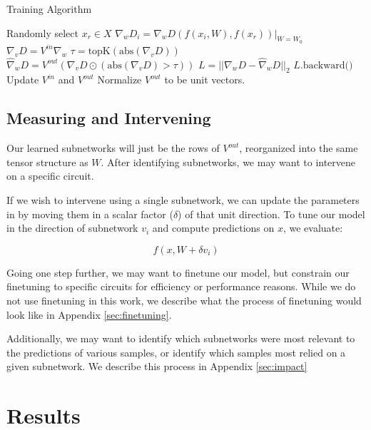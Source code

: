 \documentclass{article}
\theoremstyle{plain}
\theoremstyle{definition}
\theoremstyle{remark}
\begin{document}
\begin{algorithm}\label{alg:training}
\caption{Training Algorithm}
\begin{algorithmic}[1]
            \STATE Randomly select $x_r \in X$
            \STATE $\nabla_w D_i = \nabla_w D(f(x_i, W), f(x_r))|_{W=W_0}$
        \ENDFOR
        \STATE $\nabla_v D = {V^{in}} \nabla_w$
        \STATE $\tau = \text{topK}(\text{abs}(\nabla_v D))$
        \STATE $\hat{\nabla}_w D = {V^{out}} (\nabla_v D \odot (\text{abs}(\nabla_v D) > \tau))$
        \STATE $L = {|| \nabla_w D - \hat{\nabla}_w D ||}_2$
        \STATE $L.\text{backward()}$
        \STATE Update $V^{in}$ and $V^{out}$
        \STATE Normalize $V^{out}$ to be unit vectors.
    \ENDFOR
\ENDFOR
\end{algorithmic}
\end{algorithm}

\subsection{Measuring and Intervening}\label{sec:intervention}

Our learned subnetworks will just be the rows of $V^{out}$, reorganized into the same tensor structure as $W$. After identifying subnetworks, we may want to intervene on a specific circuit.

If we wish to intervene using a single subnetwork, we can update the parameters in by moving them in a scalar factor ($\delta$) of that unit direction. To tune our model in the direction of subnetwork $v_i$ and compute predictions on $x$, we evaluate:

\begin{equation}
    f(x, W + \delta v_i)
\end{equation}

Going one step further, we may want to finetune our model, but constrain our finetuning to specific circuits for efficiency or performance reasons. While we do not use finetuning in this work, we describe what the process of finetuning would look like in Appendix \ref{sec:finetuning}.

Additionally, we may want to identify which subnetworks were most relevant to the predictions of various samples, or identify which samples most relied on a given subnetwork. We describe this process in Appendix \ref{sec:impact}


\section{Results}
\end{document}
